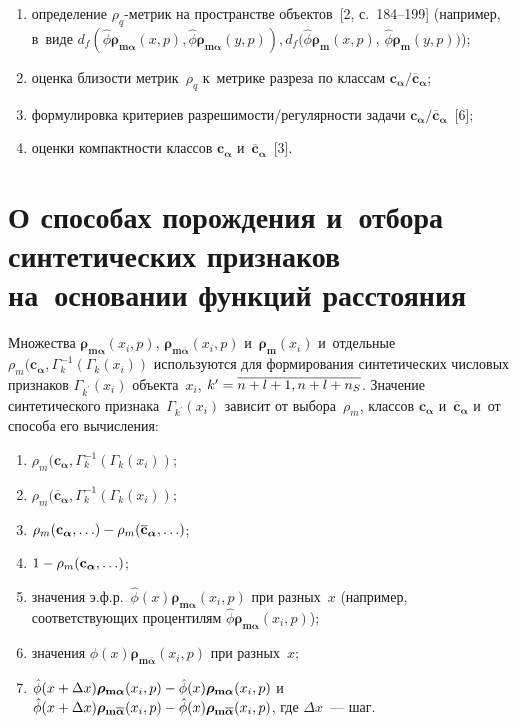 \begin{multicols}{2}
\begin{enumerate}[(1)]
\item определение $\rho_q$-мет\-рик на пространстве объектов~[2, с.~184--199] 
(например, в~виде $d_f (\hat{\phi}\bm{\rho}_{\mathbf{m}{\bm \alpha}}(x, 
{p}), \hat{\phi}\bm{\rho}_{\mathbf{m}{\bm \alpha}}(y, {p})), 
d_f (\hat{\phi}\bm{\rho}_{\mathbf{m}}(x,{p})$, 
$\hat{\phi}\bm{\rho}_{\mathbf{m}}(y, {p}))$); 
\item оценка близости метрик~$\rho_q$ к~метрике разреза по классам 
$\mathbf{c}_{\bm{\alpha}}/ \overline{\mathbf{c}}_{\bm{\alpha}}$; 
\item формулировка критериев раз\-ре\-ши\-мости/ре\-гу\-ляр\-ности задачи 
$\mathbf{c}_{\bm{\alpha}}/ \overline{\mathbf{c}}_{\bm{\alpha}}$~[6]; 
\item оценки компактности классов $\mathbf{c}_{\bm{\alpha}}$  
и~$\overline{\mathbf{c}}_{\bm{\alpha}}$~[3]. 
\end{enumerate}

\section{О способах порождения и~отбора синтетических 
признаков на~основании функций расстояния}

     Множества $\bm{\rho}_{\mathbf{m}{\bm \alpha}}(x_i,{p})$, 
$\bm{\rho}_{\mathbf{m}{\overline{\bm \alpha}}}(x_i, {p})$ 
и~$\bm{\rho}_{\mathbf{m}}(x_i)$ и~отдельные $\rho_m(\mathbf{c}_{\bm 
\alpha}, \Gamma_k^{-1}(\Gamma_k(x_i))$ используются для формирования 
синтетических числовых признаков $\Gamma_{k^\prime}(x_i)$ 
объекта~$x_i$, $k^\prime\hm= \overline{n+ l+1, n+l+n_S}$. 
Значение синтетического признака~$\Gamma_{k^\prime}(x_i)$ зависит от 
выбора~$\rho_m$, классов $\mathbf{c}_{\bm{\alpha}}$ 
и~$\overline{\mathbf{c}}_{\bm{\alpha}}$  и~от способа его вы\-чис\-ле\-ния: 
\begin{enumerate}[(1)]
\item $\rho_m(\mathbf{c}_{\bm \alpha}, \Gamma_k^{-1}(\Gamma_k(x_i))$; 
\item $\rho_m(\overline{\mathbf{c}}_{\bm \alpha}, \Gamma_k^{-1}(\Gamma_k(x_i))$; 
\item $\rho_m(\mathbf{c}_{\bm \alpha}, \ldots ) \hm- \rho_m(\overline{\mathbf{c}}_{\bm \alpha}, \ldots)$;
\item $1\hm- \rho_m(\mathbf{c}_{\bm \alpha}, \ldots)$;
\item значения э.ф.р.\ 
$\hat{\phi}(x)\bm{\rho}_{\mathbf{m}{\bm \alpha}}(x_i,{p})$ при 
разных~$x$ (например, соответствующих процентилям 
$\hat{\phi}\bm{\rho}_{\mathbf{m}{\bm \alpha}}(x_i,{p})$); 
\item значения $\hat{\phi}(x)\bm{\rho}_{\mathbf{m}\overline{\bm{\alpha}}} 
(x_i, {p})$ при разных~$x$;
\item $\hat{\phi}(x\hm+ \Delta x) 
\bm{\rho}_{\mathbf{m}{\bm \alpha}}(x_i,p) \hm- 
\hat{\phi}(x)\bm{\rho}_{\mathbf{m}{\bm \alpha}} (x_i, {p})$ 
и~$\hat{\phi}(x\hm+ \Delta x) \bm{\rho}_{\mathbf{m}{\overline{\bm \alpha}}} 
(x_i,{p}) \hm- \hat{\phi}(x)\bm{\rho}_{\mathbf{m}\overline{\bm 
\alpha}} (x_i, {p})$, где $\Delta x$~--- шаг.
\end{enumerate}
     

\end{multicols}
